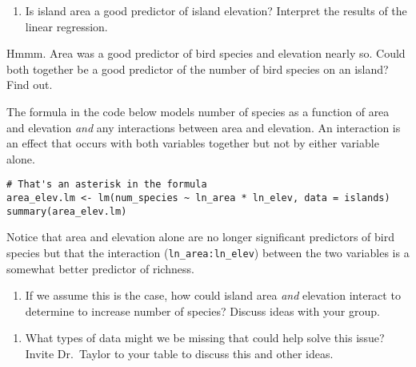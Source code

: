 \documentclass[11pt]{article}
\newcommand{\bigSpace}{\vspace{5\baselineskip}}
\begin{document}
\begin{enumerate}[resume]
\item Is island area a good predictor of island elevation? Interpret the results of the linear regression.

\bigSpace

\end{enumerate}

Hmmm. Area was a good predictor of bird species and elevation nearly so. Could both together be a good predictor of the number of bird species on an island? Find out.

The formula in the code below models number of species as a function of area and elevation \emph{and} any interactions between area and elevation. An interaction is an effect that occurs with  both variables together but not by either variable alone.

\begin{verbatim}
# That's an asterisk in the formula
area_elev.lm <- lm(num_species ~ ln_area * ln_elev, data = islands)
summary(area_elev.lm)
\end{verbatim}

Notice that area and elevation alone are no longer significant predictors of bird species but that the interaction (\texttt{ln\_area:ln\_elev}) between the two variables is a somewhat better predictor of richness.

\begin{enumerate}[resume]
\item If we assume this is the case, how could island area \emph{and} elevation interact to determine to increase number of species? Discuss ideas with your group.

\bigSpace 

\end{enumerate}


\begin{enumerate}[resume]
\item What types of data might we be missing that could help solve this issue? Invite Dr.~Taylor to your table to discuss this and other ideas.
\end{enumerate}

\newpage

\thispagestyle{empty}
\end{document}
